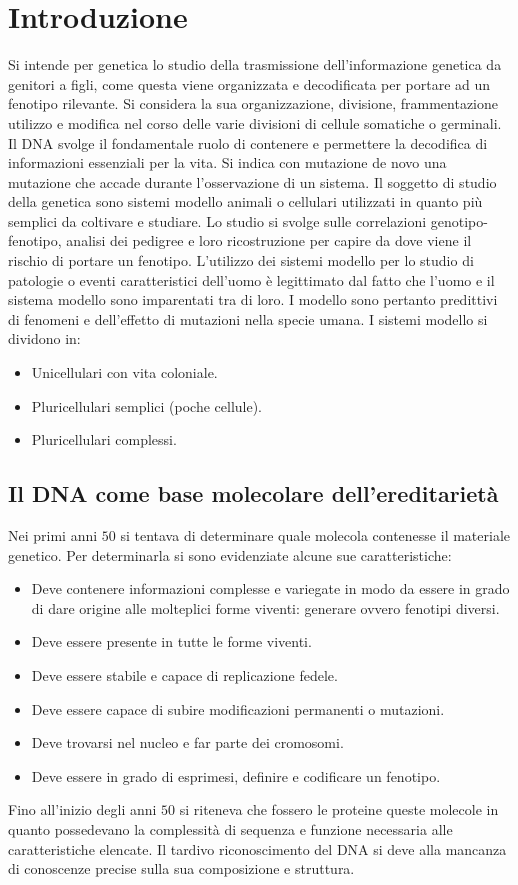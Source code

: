 \chapter{Introduzione}
Si intende per genetica lo studio della trasmissione dell'informazione genetica da genitori a figli, come questa viene organizzata e decodificata per portare ad un fenotipo rilevante. 
Si considera la sua organizzazione, divisione, frammentazione utilizzo e modifica nel corso delle varie divisioni di cellule somatiche o germinali. Il DNA svolge il fondamentale
ruolo di contenere e permettere la decodifica di informazioni essenziali per la vita. Si indica con mutazione de novo una mutazione che accade durante l'osservazione di un sistema.
Il soggetto di studio della genetica sono sistemi modello animali o cellulari utilizzati in quanto pi\`u semplici da coltivare e studiare. Lo studio si svolge sulle correlazioni 
genotipo-fenotipo, analisi dei pedigree e loro ricostruzione per capire da dove viene il rischio di portare un fenotipo. L'utilizzo dei sistemi modello per lo studio di patologie o 
eventi caratteristici dell'uomo \`e legittimato dal fatto che l'uomo e il sistema modello sono imparentati tra di loro. I modello sono pertanto predittivi di fenomeni e dell'effetto di 
mutazioni nella specie umana. I sistemi modello si dividono in:
\begin{itemize}
	\item Unicellulari con vita coloniale.
	\item Pluricellulari semplici (poche cellule).
	\item Pluricellulari complessi. 
\end{itemize}
\section{Il DNA come base molecolare dell'ereditariet\`a}
Nei primi anni $50$ si tentava di determinare quale molecola contenesse il materiale genetico. Per determinarla si sono evidenziate alcune sue caratteristiche:
\begin{itemize}
	\item Deve contenere informazioni complesse e variegate in modo da essere in grado di dare origine alle molteplici forme viventi: generare ovvero fenotipi diversi. 
	\item Deve essere presente in tutte le forme viventi.
	\item Deve essere stabile e capace di replicazione fedele. 
	\item Deve essere capace di subire modificazioni permanenti o mutazioni.
	\item Deve trovarsi nel nucleo e far parte dei cromosomi.
	\item Deve essere in grado di esprimesi, definire e codificare un fenotipo. 
\end{itemize}
Fino all'inizio degli anni $50$ si riteneva che fossero le proteine queste molecole in quanto possedevano la complessit\`a di sequenza e funzione necessaria alle caratteristiche 
elencate. Il tardivo riconoscimento del DNA si deve alla mancanza di conoscenze precise sulla sua composizione e struttura. 
